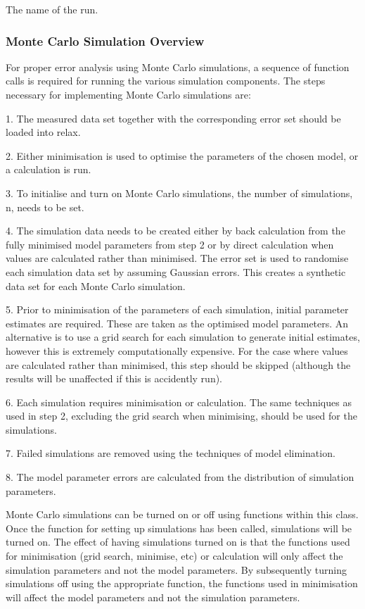   The name of the run.

\subsubsection{Monte Carlo Simulation Overview}

For proper error analysis using Monte Carlo simulations, a sequence of function calls is
required for running the various simulation components.  The steps necessary for
implementing Monte Carlo simulations are:

1.  The measured data set together with the corresponding error set should be loaded into
relax.

2.  Either minimisation is used to optimise the parameters of the chosen model, or a
calculation is run.

3.  To initialise and turn on Monte Carlo simulations, the number of simulations, n, needs
to be set.

4.  The simulation data needs to be created either by back calculation from the fully
minimised model parameters from step 2 or by direct calculation when values are calculated
rather than minimised.  The error set is used to randomise each simulation data set by
assuming Gaussian errors.  This creates a synthetic data set for each Monte Carlo
simulation.

5.  Prior to minimisation of the parameters of each simulation, initial parameter estimates
are required.  These are taken as the optimised model parameters.  An alternative is to use
a grid search for each simulation to generate initial estimates, however this is extremely
computationally expensive.  For the case where values are calculated rather than minimised,
this step should be skipped (although the results will be unaffected if this is accidently
run).

6.  Each simulation requires minimisation or calculation.  The same techniques as used in
step 2, excluding the grid search when minimising, should be used for the simulations.

7.  Failed simulations are removed using the techniques of model elimination.

8.  The model parameter errors are calculated from the distribution of simulation
parameters.


Monte Carlo simulations can be turned on or off using functions within this class.  Once the
function for setting up simulations has been called, simulations will be turned on.  The
effect of having simulations turned on is that the functions used for minimisation (grid
search, minimise, etc) or calculation will only affect the simulation parameters and not the
model parameters.  By subsequently turning simulations off using the appropriate function,
the functions used in minimisation will affect the model parameters and not the simulation
parameters.


